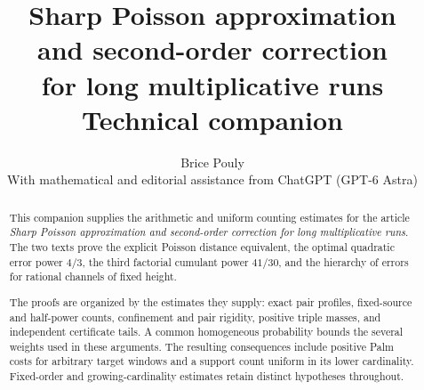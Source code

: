 \documentclass[11pt,a4paper]{article}
\title{\bfseries Sharp Poisson approximation\\and second-order correction\\for long multiplicative runs\\[9pt]\large Technical companion}
\author{Brice Pouly\\[5pt]
 \small With mathematical and editorial assistance from ChatGPT (GPT-6 Astra)}
\date{}
\begin{document}
\maketitle
\thispagestyle{plain}
\begin{abstract}
This companion supplies the arithmetic and uniform counting estimates
for the article \emph{Sharp Poisson approximation and second-order
correction for long multiplicative runs}. The two texts prove the
explicit Poisson distance equivalent, the optimal quadratic error
power $4/3$, the third factorial cumulant power $41/30$, and the
hierarchy of errors for rational channels of fixed height.

The proofs are organized by the estimates they supply: exact pair
profiles, fixed-source and half-power counts, confinement and pair
rigidity, positive triple masses, and independent certificate tails.
A common homogeneous probability bounds the several weights used
in these arguments. The resulting consequences include positive Palm
costs for arbitrary target windows and a support count uniform in
its lower cardinality. Fixed-order and growing-cardinality estimates
retain distinct hypotheses throughout.
\end{abstract}
\clearpage
\begingroup
\small
\setlength{\parskip}{0pt}
\tableofcontents
\endgroup
\clearpage


















\clearpage

\end{document}
